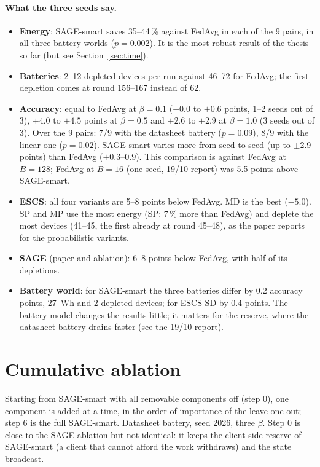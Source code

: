 \documentclass[11pt,a4paper]{article}
\begin{document}
\paragraph{What the three seeds say.}
\begin{itemize}
  \item \textbf{Energy}: SAGE-smart saves 35--44\,\% against FedAvg in each of
        the 9 pairs, in all three battery worlds ($p=0.002$). It is the most
        robust result of the thesis so far (but see Section~\ref{sec:time}).
  \item \textbf{Batteries}: 2--12 depleted devices per run against 46--72 for
        FedAvg; the first depletion comes at round 156--167 instead of 62.
  \item \textbf{Accuracy}: equal to FedAvg at $\beta=0.1$ ($+0.0$ to $+0.6$
        points, 1--2 seeds out of 3), $+4.0$ to $+4.5$ points at $\beta=0.5$ and
        $+2.6$ to $+2.9$ at $\beta=1.0$ (3 seeds out of 3). Over the 9 pairs: 7/9
        with the datasheet battery ($p=0.09$), 8/9 with the linear one
        ($p=0.02$). SAGE-smart varies more from seed to seed (up to $\pm$2.9
        points) than FedAvg ($\pm$0.3--0.9). This comparison is against FedAvg at $B=128$;
        FedAvg at $B=16$ (one seed, 19/10 report) was 5.5 points above SAGE-smart.
  \item \textbf{ESCS}: all four variants are 5--8 points below FedAvg. MD is the
        best ($-5.0$). SP and MP use the most energy (SP: 7\,\% more than FedAvg)
        and deplete the most devices (41--45, the first already at round 45--48),
        as the paper reports for the probabilistic variants.
  \item \textbf{SAGE} (paper and ablation): 6--8 points below FedAvg, with half
        of its depletions.
  \item \textbf{Battery world}: for SAGE-smart the three batteries differ by
        0.2 accuracy points, 27~Wh and 2 depleted devices; for ESCS-SD by 0.4
        points. The battery model changes the results little; it matters for
        the reserve, where the datasheet battery drains faster (see the 19/10
        report).
\end{itemize}

\section{Cumulative ablation}
\label{sec:cum}

Starting from SAGE-smart with all removable components off (step 0), one
component is added at a time, in the order of importance of the leave-one-out;
step 6 is the full SAGE-smart. Datasheet battery, seed 2026, three $\beta$.
Step 0 is close to the SAGE ablation but not identical: it keeps the client-side
reserve of SAGE-smart (a client that cannot afford the work withdraws) and the
state broadcast.
\end{document}
